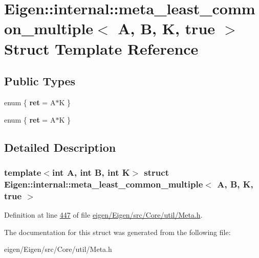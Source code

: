 \hypertarget{struct_eigen_1_1internal_1_1meta__least__common__multiple_3_01_a_00_01_b_00_01_k_00_01true_01_4}{}\section{Eigen\+:\+:internal\+:\+:meta\+\_\+least\+\_\+common\+\_\+multiple$<$ A, B, K, true $>$ Struct Template Reference}
\label{struct_eigen_1_1internal_1_1meta__least__common__multiple_3_01_a_00_01_b_00_01_k_00_01true_01_4}
\subsection*{Public Types}
\begin{DoxyCompactItemize}
\item 
\mbox{\label{struct_eigen_1_1internal_1_1meta__least__common__multiple_3_01_a_00_01_b_00_01_k_00_01true_01_4_aeaefb56cb3a69ae7f81496c4c4bfa317}} 
enum \{ {\bfseries ret} = A$\ast$K
 \}
\item 
\mbox{\label{struct_eigen_1_1internal_1_1meta__least__common__multiple_3_01_a_00_01_b_00_01_k_00_01true_01_4_ad3b7f78104f9390c336e3411d250e867}} 
enum \{ {\bfseries ret} = A$\ast$K
 \}
\end{DoxyCompactItemize}


\subsection{Detailed Description}
\subsubsection*{template$<$int A, int B, int K$>$\newline
struct Eigen\+::internal\+::meta\+\_\+least\+\_\+common\+\_\+multiple$<$ A, B, K, true $>$}



Definition at line \hyperlink{eigen_2_eigen_2src_2_core_2util_2_meta_8h_source_l00447}{447} of file \hyperlink{eigen_2_eigen_2src_2_core_2util_2_meta_8h_source}{eigen/\+Eigen/src/\+Core/util/\+Meta.\+h}.



The documentation for this struct was generated from the following file\+:\begin{DoxyCompactItemize}
\item 
eigen/\+Eigen/src/\+Core/util/\+Meta.\+h\end{DoxyCompactItemize}
